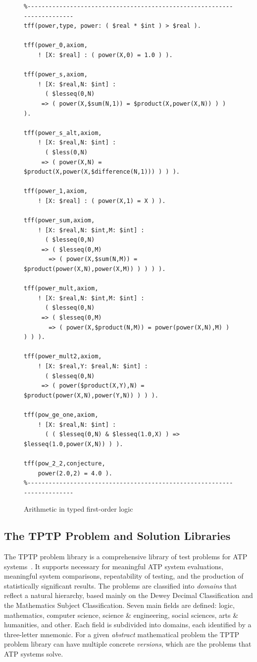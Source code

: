 \documentclass[runningheads]{llncs}
\begin{document}
\begin{figure}[htb]
\centering
{\footnotesize
{\setlength{\baselineskip}{3mm}
\begin{verbatim}
%------------------------------------------------------------------------
tff(power,type, power: ( $real * $int ) > $real ).

tff(power_0,axiom,
    ! [X: $real] : ( power(X,0) = 1.0 ) ).

tff(power_s,axiom,
    ! [X: $real,N: $int] :
      ( $lesseq(0,N) 
     => ( power(X,$sum(N,1)) = $product(X,power(X,N)) ) ) ).

tff(power_s_alt,axiom,
    ! [X: $real,N: $int] :
      ( $less(0,N) 
     => ( power(X,N) = $product(X,power(X,$difference(N,1))) ) ) ).

tff(power_1,axiom,
    ! [X: $real] : ( power(X,1) = X ) ).

tff(power_sum,axiom,
    ! [X: $real,N: $int,M: $int] :
      ( $lesseq(0,N)
     => ( $lesseq(0,M) 
       => ( power(X,$sum(N,M)) = $product(power(X,N),power(X,M)) ) ) ) ).

tff(power_mult,axiom,
    ! [X: $real,N: $int,M: $int] :
      ( $lesseq(0,N)
     => ( $lesseq(0,M) 
       => ( power(X,$product(N,M)) = power(power(X,N),M) ) ) ) ).

tff(power_mult2,axiom,
    ! [X: $real,Y: $real,N: $int] :
      ( $lesseq(0,N)
     => ( power($product(X,Y),N) = $product(power(X,N),power(Y,N)) ) ) ).

tff(pow_ge_one,axiom,
    ! [X: $real,N: $int] :
      ( ( $lesseq(0,N) & $lesseq(1.0,X) ) => $lesseq(1.0,power(X,N)) ) ).

tff(pow_2_2,conjecture,
    power(2.0,2) = 4.0 ).
%------------------------------------------------------------------------
\end{verbatim}
}}
\caption{Arithmetic in typed first-order logic}
\label{ExampleTF0}
\end{figure}

\subsection{The TPTP Problem and Solution Libraries}
\label{TPTPTSTP}

The TPTP problem library is a comprehensive library of test problems for ATP systems~\cite{Sut09}.
It supports necessary for meaningful ATP system evaluations, meaningful system comparisons, 
repeatability of testing, and the production of statistically significant results. 
The problems are classified into {\em domains} that reflect a natural hierarchy,
based mainly on the Dewey Decimal Classification and the Mathematics Subject Classification.
Seven main fields are defined: logic, mathematics, computer science, science \& engineering, 
social sciences, arts \& humanities, and other. 
Each field is subdivided into domains, each identified by a three-letter mnemonic.
For a given {\em abstract} mathematical problem the TPTP problem library can have multiple 
concrete {\em versions}, which are the problems that ATP systems solve. 
\end{document}
